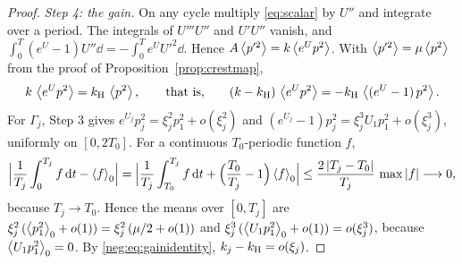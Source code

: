 \begin{proof}
\emph{Step 4: the gain.} On any cycle multiply \eqref{eq:scalar} by $U''$ and integrate over a period. The integrals of $U'''U''$ and $U'U''$ vanish, and $\int_0^T(e^U-1)U''\dd=-\int_0^Te^UU'^2\dd$. Hence $A\left\langle p'^2\right\rangle=k\left\langle e^Up^2\right\rangle$. With $\left\langle p'^2\right\rangle=\mu\left\langle p^2\right\rangle$ from the proof of Proposition~\ref{prop:crestmap},
\begin{equation}\label{neg:eq:gainidentity}
k\,\left\langle e^Up^2\right\rangle=k_{\mathrm H}\,\left\langle p^2\right\rangle,\qquad\text{that is,}\qquad (k-k_{\mathrm H})\,\left\langle e^Up^2\right\rangle=-k_{\mathrm H}\,\left\langle (e^U-1)\,p^2\right\rangle.
\end{equation}
For $\Gamma_j$, Step 3 gives $e^{U_j}p_j^2=\xi_j^2p_1^2+o(\xi_j^2)$ and $(e^{U_j}-1)p_j^2=\xi_j^3U_1p_1^2+o(\xi_j^3)$, uniformly on $[0,2T_0]$. For a continuous $T_0$-periodic function $f$,
\begin{equation}\label{neg:eq:meanshift}
\Bigl|\frac1{T_j}\int_0^{T_j}f\,\mathrm dt-\left\langle f\right\rangle_0\Bigr|=\Bigl|\frac1{T_j}\int_{T_0}^{T_j}f\,\mathrm dt+\Bigl(\frac{T_0}{T_j}-1\Bigr)\left\langle f\right\rangle_0\Bigr|\le\frac{2\,|T_j-T_0|}{T_j}\,\max|f|\longrightarrow0 ,
\end{equation}
because $T_j\to T_0$. Hence the means over $[0,T_j]$ are $\xi_j^2\,(\left\langle p_1^2\right\rangle_0+o(1))=\xi_j^2\,(\mu/2+o(1))$ and $\xi_j^3\,(\left\langle U_1p_1^2\right\rangle_0+o(1))=o(\xi_j^3)$, because $\left\langle U_1p_1^2\right\rangle_0=0$. By \eqref{neg:eq:gainidentity}, $k_j-k_{\mathrm H}=o(\xi_j)$.


\end{proof}
